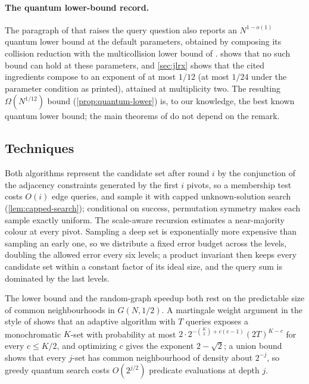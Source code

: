 \paragraph{The quantum lower-bound record.}
The paragraph of \cite{JainLiRobereXun2024} that raises the query question
also reports an $N^{1-o(1)}$ quantum lower bound at the default parameters,
obtained by composing its collision reduction with the multicollision lower
bound of \cite{LiuZhandry2019}.   shows that no such bound
can hold at these parameters, and \cref{sec:jlrx} shows that the cited
ingredients compose to an exponent of at most $1/12$ (at most $1/24$ under
the parameter condition as printed), attained at multiplicity two.  The
resulting $\Omega(N^{1/12})$ bound (\cref{prop:quantum-lower}) is, to our
knowledge, the best known quantum lower bound; the main theorems of
\cite{JainLiRobereXun2024} do not depend on the remark.

\subsection{Techniques}

Both algorithms represent the candidate set after round $i$ by the
conjunction of the adjacency constraints generated by the first $i$ pivots,
so a membership test costs $O(i)$ edge queries, and sample it with capped
unknown-solution search (\cref{lem:capped-search}); conditional on success,
permutation symmetry makes each sample exactly uniform.  The scale-aware
recursion estimates a near-majority colour at every pivot.  Sampling a deep
set is exponentially more expensive than sampling an early one, so we
distribute a fixed error budget across the levels, doubling the allowed
error every six levels; a product invariant then keeps every candidate set
within a constant factor of its ideal size, and the query sum is dominated
by the last levels.

The lower bound and the random-graph speedup both rest on the predictable
size of common neighbourhoods in $G(N,1/2)$.  A martingale weight argument
in the style of \cite{ConlonFoxGrinshpunHe2019} shows that an adaptive
algorithm with $T$ queries exposes a monochromatic $K$-set with probability
at most $2\cdot2^{-\binom K2+c(c-1)}(2T)^{K-c}$ for every $c\le K/2$, and
optimizing $c$ gives the exponent $2-\sqrt2$; a union bound shows that
every $j$-set has common neighbourhood of density about $2^{-j}$, so greedy
quantum search costs $O(2^{j/2})$ predicate evaluations at depth $j$.

